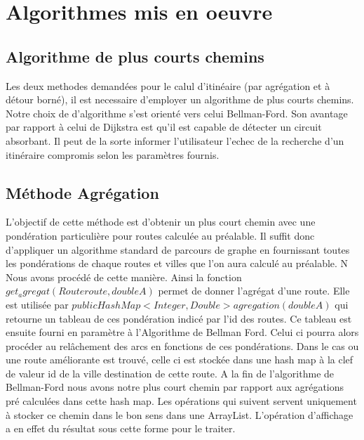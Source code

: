 \chapter{Algorithmes mis en oeuvre}


\section{Algorithme de plus courts chemins}
Les deux methodes demandées pour le calul d'itinéaire (par agrégation et à détour borné), il est necessaire  d'employer un algorithme de plus courts chemins. Notre choix de d'algorithme s'est orienté vers celui Bellman-Ford. Son avantage par rapport à celui de Dijkstra est qu'il est capable de détecter un circuit absorbant. Il peut de la sorte informer l'utilisateur l'echec de la recherche d'un itinéraire compromis selon les paramètres fournis. 



\section{Méthode Agrégation}
L'objectif de cette méthode est d'obtenir un plus court chemin avec une pondération particulière pour routes calculée au préalable.
Il suffit donc d'appliquer un algorithme standard de parcours de graphe en fournissant toutes les pondérations de chaque routes et villes que l'on aura calculé au préalable. N Nous avons procédé de cette manière. Ainsi la fonction $get_agregat(Route route, double A)$ permet de donner l'agrégat d'une route. Elle est utilisée par  $public HashMap<Integer, Double> agregation(double A)$ qui retourne un tableau de ces pondération indicé par l'id des routes. Ce tableau est ensuite fourni en paramètre à l'Algorithme de Bellman Ford. Celui ci pourra alors procéder au relâchement des arcs en fonctions de ces pondérations. Dans le cas ou une route améliorante est trouvé, celle ci est stockée dans une hash map à la clef de valeur id de la ville destination de cette route. A la fin de l'algorithme de Bellman-Ford  nous avons notre plus court chemin par rapport aux agrégations pré calculées dans cette hash map. Les opérations qui suivent servent uniquement à stocker ce chemin dans le bon sens dans une ArrayList. L'opération d'affichage a en effet du résultat sous cette forme pour le traiter.

\clearpage
